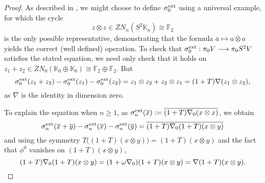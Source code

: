 \documentclass[11pt]{amsart} \renewcommand{\baselinestretch}{1.2}
\theoremstyle{plain}
\numberwithin{equation}{section} %
\theoremstyle{plain}
\numberwithin{equation}{chapter} %
\let\oldphi\phi
\let\phi\varphi
\renewcommand{\to}{\longrightarrow}
\newcommand{\citeBOX}[2][]{\cite[\mbox{#1}]{#2}}
\newcommand{\Nabla}{\nabla}
\newcommand{\F}{\mathbb{F}}
\newcommand{\Ftwo}{\F_2}
\renewcommand{\mapsto}{\longmapsto}
\begin{document}
\begin{Constructing homotopy operations}
\begin{proof}
As described in \citeBOX[\S3]{MR1089001}, we might choose to define $\sigma^\textup{ext}_0$ using a universal example, for which the cycle 
\[z\otimes z\in ZN_n(S^2\mathbb{K}_n)\cong \Ftwo \]
is the only possible representative, demonstrating that the formula $\overline{a}\mapsto \overline{a\otimes a}$ yields the correct (well defined) operation. To check that $\sigma_0^\textup{ext}:\pi_0V\to \pi_0S^2V$ satisfies the stated equation, we need only check that it holds on $z_1+z_2\in ZN_0(\mathbb{K}_0\oplus \mathbb{K}_0)\cong \Ftwo \oplus \Ftwo $. But
\[\sigma_0^\textup{ext}(z_1+z_2)-\sigma_0^\textup{ext}(z_1)-\sigma_0^\textup{ext}(z_2)=z_1\otimes z_2+z_2\otimes z_1=(1+T)\Nabla(z_1\otimes z_2),\]
as $\Nabla$ is the identity in dimension zero.

To explain the equation when $n\geq1$, as $\sigma_n^\textup{ext}(\overline{x}):=\overline{(1+T)\Nabla_0(x\otimes x)}$, we obtain %
\[\sigma_n^\textup{ext}(\overline{x}+\overline{y})-\sigma_n^\textup{ext}(\overline{x})-\sigma_n^\textup{ext}(\overline{y})
=
\overline{(1+T)\Nabla_0(1+T)(x\otimes y)}\]
and using the symmetry  $T\bigl((1+T)(x\otimes y)\bigr)=(1+T)(x\otimes y)$ and the fact that $\oldphi^0$ vanishes on $(1+T)(x\otimes y)$,
\[
(1+T)\Nabla_0(1+T)(x\otimes y)
=
(1+\omega\Nabla_0)(1+T)(x\otimes y)
=
\Nabla(1+T)(x\otimes y).\qedhere
\]
\end{proof}


\end{Constructing homotopy operations}
\end{document}
